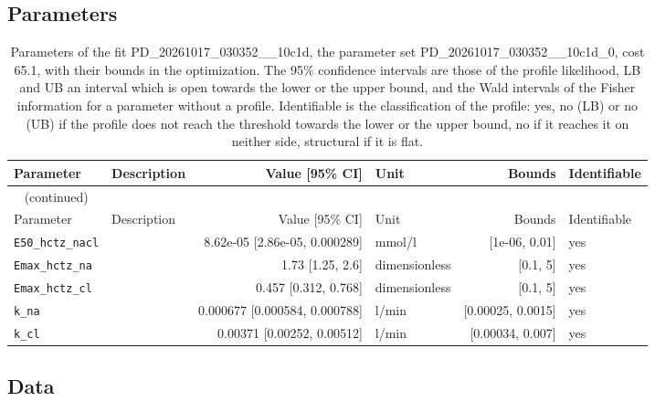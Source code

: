 \documentclass{article}
\begin{document}
\subsection{Parameters}

\begin{longtable}{llrlrl}
\caption{Parameters of the fit PD\_20261017\_030352\_\_10c1d, the parameter set PD\_20261017\_030352\_\_10c1d\_0, cost 65.1, with their bounds in the optimization. The 95\% confidence intervals are those of the profile likelihood, LB and UB an interval which is open towards the lower or the upper bound, and the Wald intervals of the Fisher information for a parameter without a profile. Identifiable is the classification of the profile: yes, no (LB) or no (UB) if the profile does not reach the threshold towards the lower or the upper bound, no if it reaches it on neither side, structural if it is flat.}\label{tab:parameters:PD_20261017_030352__10c1d} \\
\toprule
Parameter & Description & Value [95\% CI] & Unit & Bounds & Identifiable \\
\midrule
\endfirsthead
\multicolumn{6}{l}{\small\tablename~\thetable{} (continued)} \\
\toprule
Parameter & Description & Value [95\% CI] & Unit & Bounds & Identifiable \\
\midrule
\endhead
\bottomrule
\endlastfoot
\texttt{E50\_hctz\_nacl} &  & 8.62e-05 [2.86e-05, 0.000289] & mmol/l & [1e-06, 0.01] & yes \\
\texttt{Emax\_hctz\_na} &  & 1.73 [1.25, 2.6] & dimensionless & [0.1, 5] & yes \\
\texttt{Emax\_hctz\_cl} &  & 0.457 [0.312, 0.768] & dimensionless & [0.1, 5] & yes \\
\texttt{k\_na} &  & 0.000677 [0.000584, 0.000788] & l/min & [0.00025, 0.0015] & yes \\
\texttt{k\_cl} &  & 0.00371 [0.00252, 0.00512] & l/min & [0.00034, 0.007] & yes \\
\end{longtable}

\subsection{Data}
\end{document}
